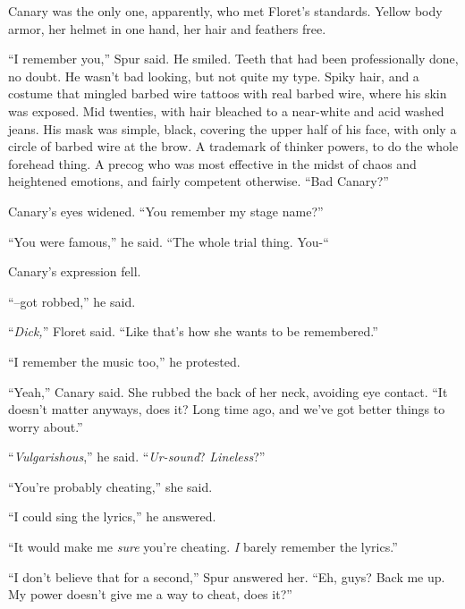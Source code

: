 Canary was the only one, apparently, who met Floret's standards.  Yellow body armor, her helmet in one hand, her hair and feathers free.



``I remember you,'' Spur said.  He smiled.  Teeth that had been professionally done, no doubt.  He wasn't bad looking, but not quite my type.  Spiky hair, and a costume that mingled barbed wire tattoos with real barbed wire, where his skin was exposed.  Mid twenties, with hair bleached to a near-white and acid washed jeans.  His mask was simple, black, covering the upper half of his face, with only a circle of barbed wire at the brow.  A trademark of thinker powers, to do the whole forehead thing.  A precog who was most effective in the midst of chaos and heightened emotions, and fairly competent otherwise.  ``Bad Canary?''



Canary's eyes widened.  ``You remember my stage name?''



``You were famous,'' he said.  ``The whole trial thing.  You-``



Canary's expression fell.



``--got robbed,'' he said.



``\emph{Dick,}'' Floret said.  ``Like that's how she wants to be remembered.''



``I remember the music too,'' he protested.



``Yeah,'' Canary said.  She rubbed the back of her neck, avoiding eye contact.  ``It doesn't matter anyways, does it?  Long time ago, and we've got better things to worry about.''



``\emph{Vulgarishous},'' he said.  ``\emph{Ur-sound}?  \emph{Lineless}?''



``You're probably cheating,'' she said.



``I could sing the lyrics,'' he answered.



``It would make me \emph{sure} you're cheating.  \emph{I} barely remember the lyrics.''



``I don't believe that for a second,'' Spur answered her.  ``Eh, guys?  Back me up.  My power doesn't give me a way to cheat, does it?''



